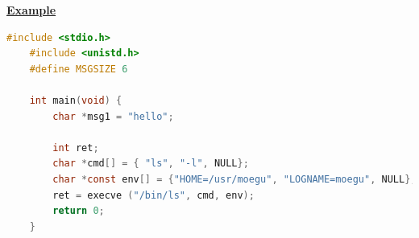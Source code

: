 \documentclass[12pt]{article}
\begin{document}
\begin{enumerate}[1.]
\begin{itemize}
        \bigskip

        \underline{\textbf{Example}}

        \bigskip

\begin{lstlisting}[language=c]
    #include <stdio.h>
    #include <unistd.h>
    #define MSGSIZE 6

    int main(void) {
        char *msg1 = "hello";

        int ret;
        char *cmd[] = { "ls", "-l", NULL};
        char *const env[] = {"HOME=/usr/moegu", "LOGNAME=moegu", NULL};
        ret = execve ("/bin/ls", cmd, env);
        return 0;
    }
\end{lstlisting}
    \end{itemize}


\end{enumerate}
\end{document}
